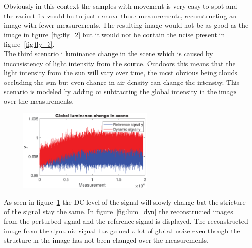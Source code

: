 Obviously in this context the samples with movement is very easy to spot and the easiest fix would be to just remove those measurements, reconstructing an image with fewer measurements. The resulting image would not be as good as the image in figure~\ref{fig:fly_2} but it would not be contain the noise present in figure~\ref{fig:fly_3}.\\[0.1in]




The third scenario i luminance change in the scene which is caused by inconsistency of light intensity from the source. Outdoors this means that the light intensity from the sun will vary over time, the most obvious being clouds occluding the sun but even change in air density can change the intensity. This scenario is modeled by adding or subtracting the global intensity in the image over the measurements. 

\begin{figure}[H]
    \includegraphics[width=0.6\textwidth]{result/dynamic/lum/intense_change1.eps}
    \label{fig:lum_sig_1}
\end{figure}

As seen in figure~\ref{fig:lum_sig_1} the DC level of the signal will slowly change but the stricture of the signal stay the same. In figure~\ref{fig:lum_dyn} the reconstructed images from the perturbed signal and the reference signal is displayed. The reconstructed image from the dynamic signal has gained a lot of global noise even though the structure in the image has not been changed over the measurements.  


